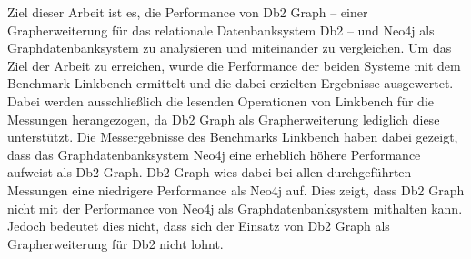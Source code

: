 Ziel dieser Arbeit ist es, die Performance von Db2 Graph -- einer Grapherweiterung für das relationale Datenbanksystem Db2 -- und Neo4j als Graphdatenbanksystem zu analysieren und miteinander zu vergleichen. Um das Ziel der Arbeit zu erreichen, wurde die Performance der beiden Systeme mit dem Benchmark Linkbench ermittelt und die dabei erzielten Ergebnisse ausgewertet. Dabei werden ausschließlich die lesenden Operationen von Linkbench für die Messungen herangezogen, da Db2 Graph als Grapherweiterung lediglich diese unterstützt. Die Messergebnisse des Benchmarks Linkbench haben dabei gezeigt, dass das Graphdatenbanksystem Neo4j eine erheblich höhere Performance aufweist als Db2 Graph. Db2 Graph wies dabei bei allen durchgeführten Messungen eine niedrigere Performance als Neo4j auf. Dies zeigt, dass Db2 Graph nicht mit der Performance von Neo4j als Graphdatenbanksystem mithalten kann. Jedoch bedeutet dies nicht, dass sich der Einsatz von Db2 Graph als Grapherweiterung für Db2 nicht lohnt.